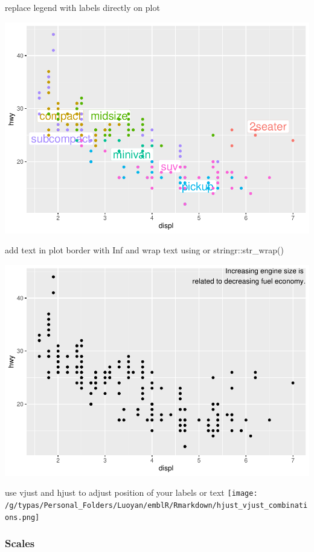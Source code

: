 \documentclass[
]{article}
\begin{document}
replace legend with labels directly on plot

\includegraphics{rmarkdown_tutorial_files/figure-latex/unnamed-chunk-18-1.pdf}

add text in plot border with Inf and wrap text using \n or
stringr::str\_wrap()

\includegraphics{rmarkdown_tutorial_files/figure-latex/unnamed-chunk-19-1.pdf}

use vjust and hjust to adjust position of your labels or text
\texttt{[image: /g/typas/Personal\_Folders/Luoyan/emblR/Rmarkdown/hjust\_vjust\_combinations.png]}

\hypertarget{scales}{%
\subsubsection{Scales}\label{scales}}
\end{document}

